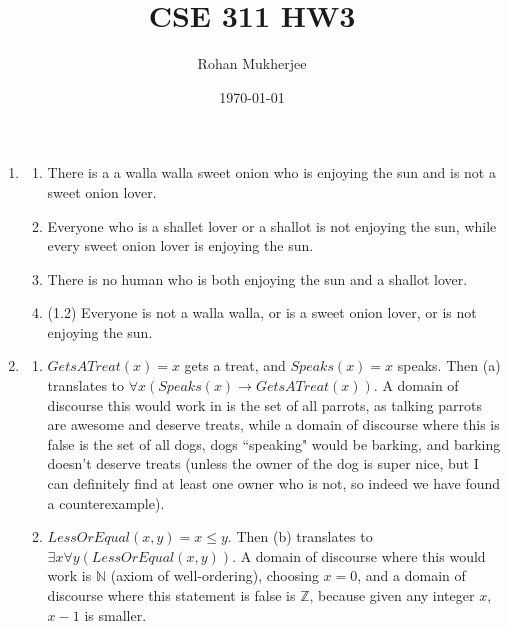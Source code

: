 \documentclass[12pt]{article}
\title{CSE 311 HW3}
\date{\today}
\author{Rohan Mukherjee}
\def\mbb#1{\mathbb{#1}}
\def\bN{\mbb{N}}
\def\bZ{\mbb{Z}}
\theoremstyle{definition}
\theoremstyle{remark}
\newcommand{\ra}{\rightarrow}
\begin{document}
	\maketitle
	\begin{enumerate}[leftmargin=\labelsep]
		\item
		\begin{enumerate}
			\item There is a a walla walla sweet onion who is enjoying the sun and is not a sweet onion lover.
			\item Everyone who is a shallet lover or a shallot is not enjoying the sun, while every sweet onion lover is enjoying the sun.
			\item There is no human who is both enjoying the sun and a shallot lover.
			\item (1.2) Everyone is not a walla walla, or is a sweet onion lover, or is not enjoying the sun.
		\end{enumerate}
		
		\newpage
		\item 
		\begin{enumerate}
			\item $GetsATreat(x) = x$ gets a treat, and $Speaks(x) = x$ speaks. Then (a) translates to $\forall x (Speaks(x) \ra GetsATreat(x))$. A domain of discourse this would work in is the set of all parrots, as talking parrots are awesome and deserve treats, while a domain of discourse where this is false is the set of all dogs, dogs ``speaking" would be barking, and barking doesn't deserve treats (unless the owner of the dog is super nice, but I can definitely find at least one owner who is not, so indeed we have found a counterexample).
			\item $LessOrEqual(x, y) = x \leq y$. Then (b) translates to $\exists x \forall y (LessOrEqual(x, y))$. A domain of discourse where this would work is $\bN$ (axiom of well-ordering), choosing $x = 0$, and a domain of discourse where this statement is false is $\bZ$, because given any integer $x$, $x-1$ is smaller.
		\end{enumerate}
	

\end{enumerate}
\end{document}
